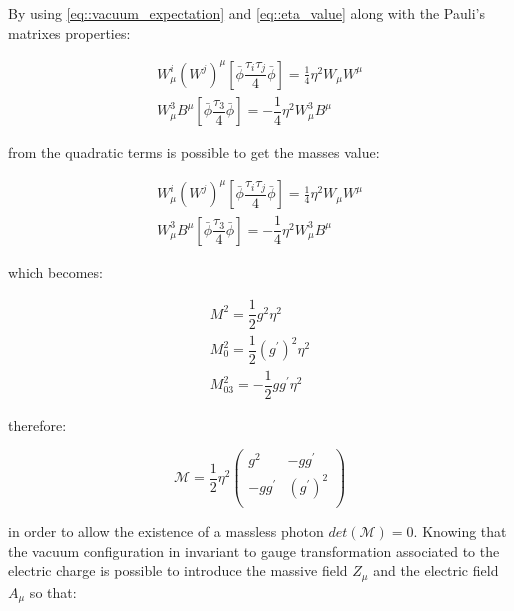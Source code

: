 By using  \ref{eq::vacuum_expectation} and \ref{eq::eta_value} along with the Pauli's matrixes properties:

\begin{equation}
\begin{array}{c}
 W_{\mu}^{i}(W^{j})^{\mu} \left[ \bar{\phi} \dfrac{\tau_{i}\tau_{j}}{4}\bar{\phi}\right] = \frac{1}{4}\eta^{2} W_{\mu}W^{\mu} \\

 W^{3}_{\mu} B^{\mu} \left[ \bar{\phi} \dfrac{\tau_{3}}{4} \bar{\phi} \right] = - \dfrac{1}{4} \eta^{2} W^{3}_{\mu}B^{\mu}
 \end{array}
\end{equation}

from the quadratic terms is possible to get the masses value:

\begin{equation}
\begin{array}{c}
W_{\mu}^{i}(W^{j})^{\mu} \left[ \bar{\phi} \dfrac{\tau_{i}\tau_{j}}{4}\bar{\phi}\right] = \frac{1}{4}\eta^{2} W_{\mu}W^{\mu} \\

W^{3}_{\mu} B^{\mu} \left[ \bar{\phi} \dfrac{\tau_{3}}{4} \bar{\phi} \right] = - \dfrac{1}{4} \eta^{2} W^{3}_{\mu}B^{\mu}
\end{array}
\end{equation}

which becomes:

\begin{equation}
\begin{array}{c}
M^{2}  = \dfrac{1}{2} g^{2} \eta^{2}\\
M_{0}^{2}  = \dfrac{1}{2} (g^{\prime})^{2} \eta^{2}\\
M_{03}^{2}  = -\dfrac{1}{2} gg^{\prime} \eta^{2}
\end{array}
\end{equation}

therefore:

\begin{equation}
\mathcal{M} =  \dfrac{1}{2} \eta^{2}
\begin{pmatrix}
 g^{2} & -gg^{\prime} \\
-gg^{\prime} & (g^{\prime})^{2} \\
\end{pmatrix}
\label{eq::matrix_mass}
\end{equation}

in order to allow the existence of a massless photon $det(\mathcal{M}) = 0$. Knowing that the vacuum configuration in invariant to gauge transformation associated to the electric charge is possible to introduce the massive field $Z_{\mu}$ and the electric field $A_{\mu}$ so that:

